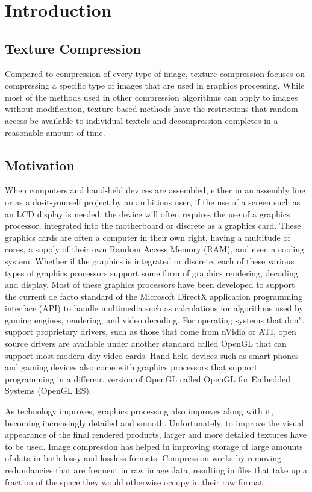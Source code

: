 \documentclass[12pt]{article}
\begin{document}
\tableofcontents
\newpage

\section{Introduction}

\subsection{Texture Compression}
Compared to compression of every type of image, texture compression focuses on compressing a specific type of images that are used in graphics processing. While most of the methods used in other compression algorithms can apply to images without modification, texture based methods have the restrictions that random access be available to individual textels and decompression completes in a reasonable amount of time.

\subsection{Motivation}
When computers and hand-held devices are assembled, either in an assembly line or as a do-it-yourself project by an ambitious user, if the use of a screen such as an LCD display is needed, the device will often requires the use of a graphics processor, integrated into the motherboard or discrete as a graphics card. These graphics cards are often a computer in their own right, having a multitude of cores, a supply of their own Random Access Memory (RAM), and even a cooling system. Whether if the graphics is integrated or discrete, each of these various types of graphics processors support some form of graphics rendering, decoding and display. Most of these graphics processors have been developed to support the current de facto standard of the Microsoft DirectX application programming interface (API) to handle multimedia such as calculations for algorithms used by gaming engines, rendering, and video decoding. For operating systems that don't support proprietary drivers, such as those that come from nVidia or ATI, open source drivers are available under another standard called OpenGL that can support most modern day video cards. Hand held devices such as smart phones and gaming devices also come with graphics processors that support programming in a different version of OpenGL called OpenGL for Embedded Systems (OpenGL ES).

As technology improves, graphics processing also improves along with it, becoming increasingly detailed and smooth. Unfortunately, to improve the visual appearance of the final rendered products, larger and more detailed textures have to be used. Image compression has helped in improving storage of large amounts of data in both lossy and lossless formats. Compression works by removing redundancies that are frequent in raw image data, resulting in files that take up a fraction of the space they would otherwise occupy in their raw format.
\end{document}
